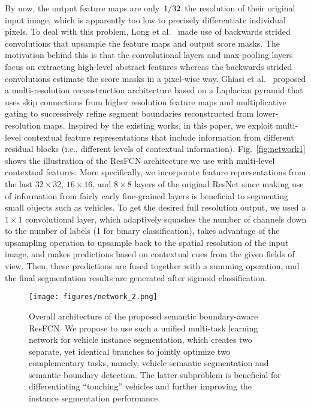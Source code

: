 \documentclass[journal]{IEEEtran}
\begin{document}
By now, the output feature maps are only $\left. 1 \middle/ 32 \right.$ the resolution of their original input image, which is apparently too low to precisely differentiate individual pixels. To deal with this problem, Long et al.~\cite{FCN} made use of backwards strided convolutions that upsample the feature maps and output score masks. The motivation behind this is that the convolutional layers and max-pooling layers focus on extracting high-level abstract features whereas the backwards strided convolutions estimate the score masks in a pixel-wise way. Ghiasi et al.~\cite{Ghiasi16} proposed a multi-resolution reconstruction architecture based on a Laplacian pyramid that uses skip connections from higher resolution feature maps and multiplicative gating to successively refine segment boundaries reconstructed from lower-resolution maps. Inspired by the existing works, in this paper, we exploit multi-level contextual feature representations that include information from different residual blocks (i.e., different levels of contextual information). Fig.~\ref{fig:network1} shows the illustration of the ResFCN architecture we use with multi-level contextual features. More specifically, we incorporate feature representations from the last $32\times32$, $16\times16$, and $8\times8$ layers of the original ResNet since making use of information from fairly early fine-grained layers is beneficial to segmenting small objects such as vehicles. To get the desired full resolution output, we used a $1\times1$ convolutional layer, which adaptively squashes the number of channels down to the number of labels (1 for binary classification), takes advantage of the upsampling operation to upsample back to the spatial resolution of the input image, and makes predictions based on contextual cues from the given fields of view. Then, these predictions are fused together with a summing operation, and the final segmentation results are generated after sigmoid classification.

\begin{figure*}[t]
\centering
\texttt{[image: figures/network\_2.png]}
\renewcommand{\figurename}{Fig}
\caption{\label{fig:network2} Overall architecture of the proposed semantic boundary-aware ResFCN. We propose to use such a unified multi-task learning network for vehicle instance segmentation, which creates two separate, yet identical branches to jointly optimize two complementary tasks, namely, vehicle semantic segmentation and semantic boundary detection. The latter subproblem is beneficial for differentiating ``touching'' vehicles and further improving the instance segmentation performance.}
\end{figure*}
\end{document}
